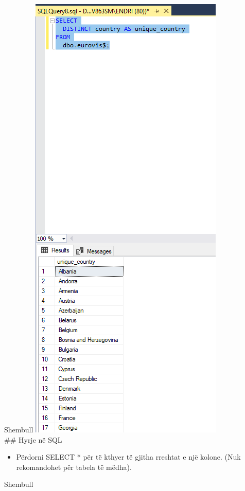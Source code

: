 \documentclass[
  ignorenonframetext,
]{beamer}
\newenvironment{Shaded}{\begin{snugshade}}{\end{snugshade}}
\newcommand{\KeywordTok}[1]{\textcolor[rgb]{0.13,0.29,0.53}{\textbf{#1}}}
\newcommand{\NormalTok}[1]{#1}
\newcommand{\OperatorTok}[1]{\textcolor[rgb]{0.81,0.36,0.00}{\textbf{#1}}}
\providecommand{\tightlist}{%
  \setlength{\itemsep}{0pt}\setlength{\parskip}{0pt}}
\begin{document}
\begin{frame}{Shembull}
\label{shembull-5}
\includegraphics{./Figs/query4.png}\\
\#\# Hyrje në SQL

\begin{itemize}
\tightlist
\item
  Përdorni SELECT * për të kthyer të gjitha rreshtat e një kolone. (Nuk
  rekomandohet për tabela të mëdha).
\end{itemize}
\end{frame}

\begin{frame}[fragile]{Shembull}
\label{shembull-6}
\begin{Shaded}
\end{Shaded}
\end{frame}
\end{document}
